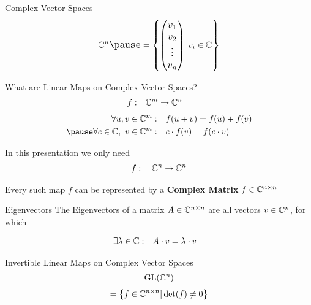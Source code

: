\begin{frame}{Complex Vector Spaces}
    \huge
    \begin{align*}
        \C^n \large \pause
        = \left\{
            \begin{pmatrix}
                v_1 \\ v_2 \\ \vdots \\ v_n
            \end{pmatrix} | v_i \in \C
        \right\}
    \end{align*}

\end{frame}

\begin{frame}{What are Linear Maps on Complex Vector Spaces?}
    \Large
    \begin{align*}
        f: \quad & \mathbb{C}^m \to \mathbb{C}^n
    \end{align*}
    \large
    \begin{align*}
        \forall u, v \in \C^m: \quad & f(u + v) = f(u) + f(v) \\ \pause
        \forall c \in \C,\ v \in \C^m: \quad & c \cdot f(v) = f(c \cdot v)
    \end{align*}
    
    \pause
    In this presentation we only need
    \Large
    \begin{align*}
        f: \quad \mathbb{C}^n \to \mathbb{C}^n
    \end{align*}

    \large
    \pause
    Every such map $f$ can be represented by a \textbf{Complex Matrix} $f \in \mathbb{C}^{n \times n}$
    \vspace{2em}
\end{frame}

\begin{frame}{Eigenvectors}
    \large
    The Eigenvectors of a matrix $A \in \mathbb{C}^{n \times n}$ are all vectors $v \in \mathbb{C}^n$, for which

    \pause
    \begin{align*}
        \exists \lambda \in \mathbb{C}: \quad & A \cdot v = \lambda \cdot v
    \end{align*}
\end{frame}

\begin{frame}{Invertible Linear Maps on Complex Vector Spaces}
    \huge
    \begin{align*}
        \operatorname{GL}(\mathbb{C}^n)
    \end{align*}
    \pause
    \large
    \begin{align*}
        = \left\{
            f \in \mathbb{C}^{n \times n} | \det(f) \neq 0
        \right\}
    \end{align*}

\end{frame}

